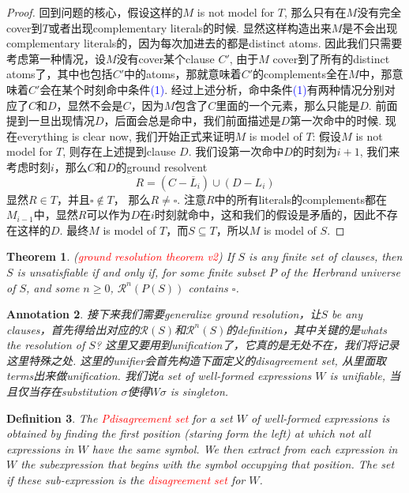 \documentclass{article}
\theoremstyle{plain}
\newtheorem{theorem}{Theorem}
\newtheorem{definition}[theorem]{Definition}
\newtheorem{annotation}[theorem]{Annotation}
\theoremstyle{nonumberplain}
\newtheorem{proof}{Proof}
\newcommand{\redt}[1]{\textcolor{red}{#1}}
\newcommand{\bluet}[1]{\textcolor{blue}{#1}}
\begin{document}
\begin{proof}
回到问题的核心，假设这样的$M$ is not model for $T$, 那么只有在$M$没有完全cover到$T$或者出现complementary literals的时候. 显然这样构造出来$M$是不会出现complementary literals的，因为每次加进去的都是distinct atoms. 因此我们只需要考虑第一种情况，设$M$没有cover某个clause $C'$, 由于$M$ cover到了所有的distinct atoms了，其中也包括$C'$中的atoms，那就意味着$C'$的complements全在$M$中，那意味着$C'$会在某个时刻命中条件\bluet{(1)}. 经过上述分析，命中条件\bluet{(1)}有两种情况分别对应了$C$和$D$，显然不会是$C$，因为$M$包含了$C$里面的一个元素，那么只能是$D$. 前面提到一旦出现情况$D$，后面会总是命中，我们前面描述是$D$第一次命中的时候. 现在everything is clear now, 我们开始正式来证明$M$ is model of $T$: 假设$M$ is not model for $T$, 则存在上述提到clause $D$. 我们设第一次命中$D$的时刻为$i+1$, 我们来考虑时刻$i$，那么$C$和$D$的ground resolvent 
\[
	R = (C - \overline{L}_i) \cup (D - L_i)
\]
显然$R \in T$，并且$\square \notin T$， 那么$R \neq \square$. 注意$R$中的所有literals的complements都在$M_{i-1}$中，显然$R$可以作为$D$在$i$时刻就命中，这和我们的假设是矛盾的，因此不存在这样的$D$. 最终$M$ is model of $T$，而$S \subseteq T$，所以$M$ is model of $S$. 
\end{proof}

\begin{theorem}
\rm (\redt{ground resolution theorem v2}) If $S$ is any finite set of clauses, then $S$ is unsatisfiable if and only if, for some finite subset $P$ of the Herbrand universe of $S$, and some $n \geq 0$, $\mathcal{R}^n(P(S))$ contains $\square$.
\end{theorem}

\begin{annotation}
\rm 接下来我们需要generalize ground resolution，让$S$ be any clauses，首先得给出对应的$\mathcal{R}(S)$和$\mathcal{R}^n(S)$的definition，其中关键的是whats the resolution of $S$? 这里又要用到unification了，它真的是无处不在，我们将记录这里特殊之处. 这里的unifier会首先构造下面定义的disagreement set, 从里面取terms出来做unification. 我们说a set of well-formed expressions $W$ is unifiable, 当且仅当存在substitution $\sigma$使得$W\sigma$ is singleton. 
\end{annotation}

\begin{definition}
\rm The \redt{Pdisagreement set} for a set $W$ of well-formed expressions is obtained by finding the first position (staring form the left) at which not all expressions in $W$ have the same symbol. We then extract from each expression in $W$ the subexpression that begins with  the symbol occupying that position. The set if these sub-expression is the \redt{disagreement set} for $W$.
\end{definition}
\end{document}
